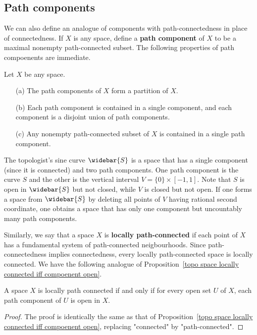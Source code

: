 \subsection{Path components}
We can also define an analogue of components with path-connectedness in place of connectedness. If $X$ is any space, define a \textbf{path component} of $X$ to be a maximal nonempty path-connected subset. The following properties of path compoenents are immediate.
\begin{proposition}
Let $X$ be any space.
\begin{itemize}
\item[(a)] The path components of $X$ form a partition of $X$.
\item[(b)] Each path component is contained in a single component, and each component is a disjoint union of path components.
\item[(c)] Any nonempty path-connected subset of $X$ is contained in a single path component.
\end{itemize}
\end{proposition}
\begin{example}
The topologist's sine curve $\widebar{S}$ is a space that has a single component (since it is connected) and two path components. One path component is the curve $S$ and the other is the vertical interval $V=\{0\}\times[-1,1]$. Note that $S$ is open in $\widebar{S}$ but not closed, while $V$ is closed but not open. If one forms a space from $\widebar{S}$ by deleting all points of $V$ having rational second coordinate, one obtains a space that has only one component but uncountably many path components.
\end{example}
Similarly, we say that a space $X$ is \textbf{locally path-connected} if each point of $X$ has a fundamental system of path-connected neigbourhoods. Since path-connectedness implies connectedness, every locally path-connected space is locally connected. We have the following analogue of Proposition~\ref{topo space locally connected iff compoenent open}.
\begin{proposition}
A space $X$ is locally path connected if and only if for every open set $U$ of $X$, each path component of $U$ is open in $X$.
\end{proposition}
\begin{proof}
The proof is identically the same as that of Proposition~\ref{topo space locally connected iff compoenent open}, replacing "connected" by "path-connected".
\end{proof}
